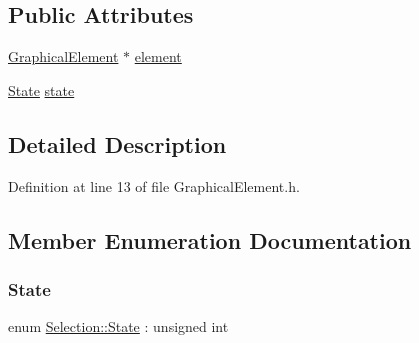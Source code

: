 \subsection*{Public Attributes}
\begin{DoxyCompactItemize}
\item 
\hyperlink{class_graphical_element}{Graphical\+Element} $\ast$ \hyperlink{struct_selection_a8bae551e7526d98cd9305069e38e8b18}{element}
\item 
\hyperlink{struct_selection_a908531395e550b540712fe90c8f6fe68}{State} \hyperlink{struct_selection_aac75790db0cfc1c96d3652999ccb3091}{state}
\end{DoxyCompactItemize}


\subsection{Detailed Description}


Definition at line 13 of file Graphical\+Element.\+h.



\subsection{Member Enumeration Documentation}
\mbox{\label{struct_selection_a908531395e550b540712fe90c8f6fe68}} 
\subsubsection{\texorpdfstring{State}{State}}
{\footnotesize\ttfamily enum \hyperlink{struct_selection_a908531395e550b540712fe90c8f6fe68}{Selection\+::\+State} \+: unsigned int}


